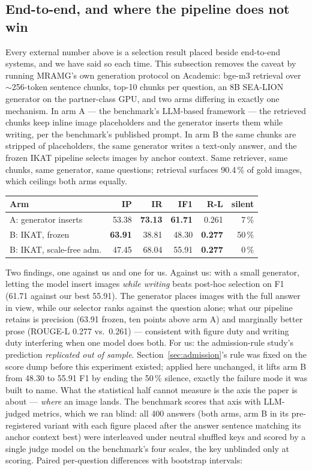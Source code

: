 \documentclass[journal]{IEEEtran}
\begin{document}
\subsection{End-to-end, and where the pipeline does not win}
\label{sec:endtoend}

Every external number above is a selection result placed beside end-to-end
systems, and we have said so each time. This subsection removes the caveat by
running MRAMG's own generation protocol on Academic: bge-m3 retrieval over
$\sim$256-token sentence chunks, top-10 chunks per question, an 8B SEA-LION
generator on the partner-class GPU, and two arms differing in exactly one
mechanism. In arm A --- the benchmark's LLM-based framework --- the retrieved
chunks keep inline image placeholders and the generator inserts them while
writing, per the benchmark's published prompt. In arm B the same chunks are
stripped of placeholders, the same generator writes a text-only answer, and
the frozen IKAT pipeline selects images by anchor context. Same retriever,
same chunks, same generator, same questions; retrieval surfaces 90.4\,\% of
gold images, which ceilings both arms equally.

\begin{center}
\begin{tabular}{@{}lrrrrr@{}}
\toprule
Arm & IP & IR & IF1 & R-L & silent \\
\midrule
A: generator inserts & 53.38 & \textbf{73.13} & \textbf{61.71} & 0.261 & 7\,\% \\
B: IKAT, frozen & \textbf{63.91} & 38.81 & 48.30 & \textbf{0.277} & 50\,\% \\
B: IKAT, scale-free adm. & 47.45 & 68.04 & 55.91 & \textbf{0.277} & 0\,\% \\
\bottomrule
\end{tabular}
\end{center}

Two findings, one against us and one for us. Against us: with a small
generator, letting the model insert images \emph{while writing} beats post-hoc
selection on F1 (61.71 against our best 55.91). The generator places images
with the full answer in view, while our selector ranks against the question
alone; what our pipeline retains is precision (63.91 frozen, ten points above
arm A) and marginally better prose (ROUGE-L 0.277 vs.\ 0.261) --- consistent
with figure duty and writing duty interfering when one model does both. For
us: the admission-rule study's prediction \emph{replicated out of sample}.
Section~\ref{sec:admission}'s rule was fixed on the score dump before this
experiment existed; applied here unchanged, it lifts arm B from 48.30 to 55.91
F1 by ending the 50\,\% silence, exactly the failure mode it was built to
name. What the statistical half cannot measure is the axis the paper is about ---
\emph{where} an image lands. The benchmark scores that axis with LLM-judged
metrics, which we ran blind: all 400 answers (both arms, arm B in its
pre-registered variant with each figure placed after the answer sentence
matching its anchor context best) were interleaved under neutral shuffled
keys and scored by a single judge model on the benchmark's four scales, the
key unblinded only at scoring. Paired per-question differences with bootstrap
intervals:
\end{document}
